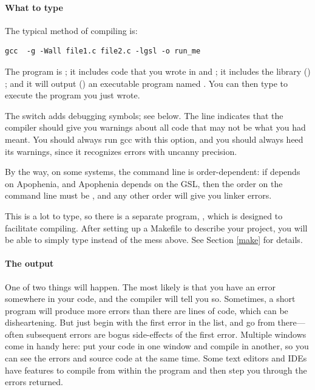 \documentclass[12pt]{article}
\def\ind#1{\index{#1}#1}
\begin{document}
\paragraph{What to type}
The typical method of compiling is:
\begin{lstlisting}
gcc  -g -Wall file1.c file2.c -lgsl -o run_me
\end{lstlisting}
The program is ; it includes code that you wrote in
 and ; it includes the library
() ;
and it will output () an executable program named . You
can then type  to execute the program you just wrote.

The  switch adds \ind{debugging} symbols; see below.  The
 line indicates that the compiler should give you warnings
about all code that may not be what you had meant. You should always run
gcc with this option, and you should always heed its warnings, since it
recognizes errors with uncanny precision.

By the way, on some systems, the command line is order-dependent: if 
depends on Apophenia, and Apophenia depends on the GSL, then the order
on the command line must be ,
and any other order will give you linker errors. 

This is a lot to type, so there is a separate program, ,
which is designed to facilitate compiling. After setting up a Makefile
to describe your project, you will be able to simply type  instead
of the mess above. See Section \ref{make} for details.

\paragraph{The output} One of two things will happen. The most likely is
that you have an error somewhere in your code, and the compiler will tell
you so. Sometimes, a short program will produce more errors than there
are lines of code, which can be disheartening. But just begin with the
first error in the list, and go from there---often subsequent errors are
bogus side-effects of the first error. Multiple windows come in handy
here: put your code in one window and compile in another, so you can
see the errors and source code at the same time. Some text editors and
IDEs have features to compile from within the program and then step you
through the errors returned.
\end{document}
